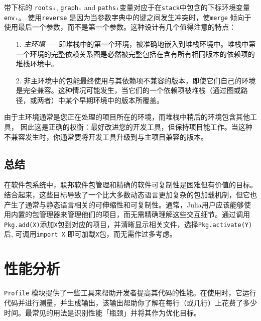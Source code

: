 带下标的 \texttt{rootsᵢ}, \texttt{graphᵢ} and \texttt{pathsᵢ}变量对应于在\texttt{stack}中包含的下标环境变量\texttt{envᵢ}。 使用\texttt{reverse} 是因为当参数字典中的键之间发生冲突时，使\texttt{merge} 倾向于使用最后一个参数，而不是第一个参数。这种设计有几个值得注意的特点：



\begin{itemize}
\item[1. ] \emph{主环境}——即堆栈中的第一个环境，被准确地嵌入到堆栈环境中。堆栈中第一个环境的完整依赖关系图是必然被完整包括在含有所有相同版本的依赖项的堆栈环境中。


\item[2. ] 非主环境中的包能最终使用与其依赖项不兼容的版本，即使它们自己的环境是完全兼容。这种情况可能发生，当它们的一个依赖项被堆栈（通过图或路径，或两者）中某个早期环境中的版本所覆盖。

\end{itemize}


由于主环境通常是您正在处理的项目所在的环境，而堆栈中稍后的环境包含其他工具， 因此这是正确的权衡：最好改进您的开发工具，但保持项目能工作。当这种不兼容发生时，你通常要将开发工具升级到与主项目兼容的版本。



\hypertarget{16711373200664757596}{}


\section{总结}



在软件包系统中，联邦软件包管理和精确的软件可复制性是困难但有价值的目标。结合起来，这些目标导致了一个比大多数动态语言更加复杂的包加载机制，但它也产生了通常与静态语言相关的可伸缩性和可复制性。通常，Julia用户应该能够使用内置的包管理器来管理他们的项目，而无需精确理解这些交互细节。通过调用\texttt{Pkg.add({\textquotedbl}X{\textquotedbl})}添加\texttt{X}包到对应的项目，并清晰显示相关文件，选择\texttt{Pkg.activate({\textquotedbl}Y{\textquotedbl})}后, 可调用\texttt{import X} 即可加载\texttt{X}包，而无需作过多考虑。



\hypertarget{13874102823603666739}{}


\chapter{性能分析}



\texttt{Profile} 模块提供了一些工具来帮助开发者提高其代码的性能。在使用时，它运行代码并进行测量，并生成输出，该输出帮助你了解在每行（或几行）上花费了多少时间。最常见的用法是识别性能「瓶颈」并将其作为优化目标。



